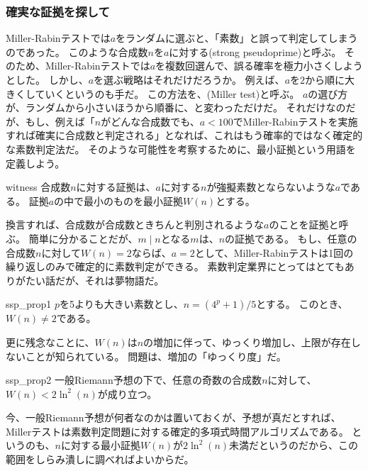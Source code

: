 \subsubsection{確実な証拠を探して}
Miller-Rabinテストでは$a$をランダムに選ぶと、「素数」と誤って判定してしまうのであった。
このような合成数$n$を$a$に対する(strong pseudoprime)と呼ぶ。
そのため、Miller-Rabinテストでは$a$を複数回選んで、誤る確率を極力小さくしようとした。
しかし、$a$を選ぶ戦略はそれだけだろうか。
例えば、$a$を$2$から順に大きくしていくというのも手だ。
この方法を、(Miller test)\cite{10.1145/800116.803773}と呼ぶ。
$a$の選び方が、ランダムから小さいほうから順番に、と変わっただけだ。
それだけなのだが、もし、例えば「$n$がどんな合成数でも、$a<100$でMiller-Rabinテストを実施すれば確実に合成数と判定される」となれば、これはもう確率的ではなく確定的な素数判定法だ。
そのような可能性を考察するために、最小証拠という用語を定義しよう。

\begin{Defi}{}{witness}
合成数$n$に対する証拠は、$a$に対する$n$が強擬素数とならないような$a$である。
証拠$a$の中で最小のものを最小証拠$W(n)$とする。
\end{Defi}

換言すれば、合成数が合成数ときちんと判別されるような$a$のことを証拠と呼ぶ。
簡単に分かることだが、$m \mid n$となる$m$は、$n$の証拠である。
もし、任意の合成数$n$に対して$W(n)=2$ならば、$a=2$として、Miller-Rabinテストは1回の繰り返しのみで確定的に素数判定ができる。
素数判定業界にとってはとてもありがたい話だが、それは夢物語だ。

\begin{Theo}{}{ssp_prop1}
$p$を5よりも大きい素数とし、$n=(4^p+1)/5$とする。
このとき、$W(n)\neq2$である。
\end{Theo}

更に残念なことに、$W(n)$は$n$の増加に伴って、ゆっくり増加し、上限が存在しないことが知られている\cite{10.1007/3-540-58691-1_36}。
問題は、増加の「ゆっくり度」だ。

\begin{Theo}{}{ssp_prop2}
一般Riemann予想の下で、任意の奇数の合成数$n$に対して、$W(n)<2\ln^2(n)$が成り立つ。
\end{Theo}

今、一般Riemann予想が何者なのかは置いておくが、予想が真だとすれば、Millerテストは素数判定問題に対する確定的多項式時間アルゴリズムである。
というのも、$n$に対する最小証拠$W(n)$が$2\ln^2(n)$未満だというのだから、この範囲をしらみ潰しに調べればよいからだ。

